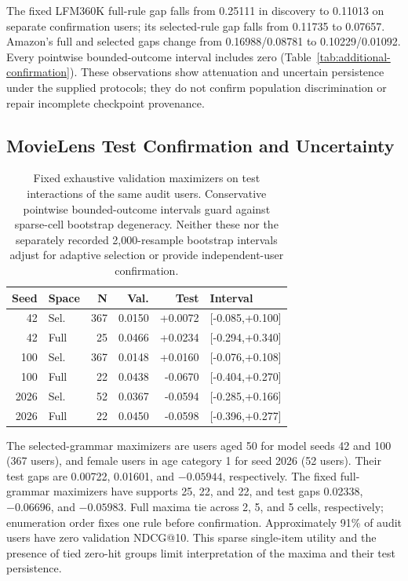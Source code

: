 \documentclass[sigconf,nonacm]{acmart}
\begin{document}
The fixed LFM360K full-rule gap falls from 0.25111 in discovery to 0.11013 on separate confirmation users; its selected-rule gap falls from 0.11735 to 0.07657. Amazon's full and selected gaps change from 0.16988/0.08781 to 0.10229/0.01092. Every pointwise bounded-outcome interval includes zero (Table~\ref{tab:additional-confirmation}). These observations show attenuation and uncertain persistence under the supplied protocols; they do not confirm population discrimination or repair incomplete checkpoint provenance.

\subsection{MovieLens Test Confirmation and Uncertainty}
\begin{table}[t]
\centering
\caption{Fixed exhaustive validation maximizers on test interactions of the same audit users. Conservative pointwise bounded-outcome intervals guard against sparse-cell bootstrap degeneracy. Neither these nor the separately recorded 2,000-resample bootstrap intervals adjust for adaptive selection or provide independent-user confirmation.}
\label{tab:extended-confirmation}
\small
\begin{tabular}{rlrrrl}
\toprule
Seed & Space & N & Val. & Test & Interval \\
\midrule
42 & Sel. & 367 & 0.0150 & +0.0072 & [-0.085,+0.100] \\
42 & Full & 25 & 0.0466 & +0.0234 & [-0.294,+0.340] \\
100 & Sel. & 367 & 0.0148 & +0.0160 & [-0.076,+0.108] \\
100 & Full & 22 & 0.0438 & -0.0670 & [-0.404,+0.270] \\
2026 & Sel. & 52 & 0.0367 & -0.0594 & [-0.285,+0.166] \\
2026 & Full & 22 & 0.0450 & -0.0598 & [-0.396,+0.277] \\
\bottomrule
\end{tabular}
\end{table}

The selected-grammar maximizers are users aged 50 for model seeds 42 and 100 (367 users), and female users in age category 1 for seed 2026 (52 users). Their test gaps are 0.00722, 0.01601, and $-0.05944$, respectively. The fixed full-grammar maximizers have supports 25, 22, and 22, and test gaps 0.02338, $-0.06696$, and $-0.05983$. Full maxima tie across 2, 5, and 5 cells, respectively; enumeration order fixes one rule before confirmation. Approximately 91\% of audit users have zero validation NDCG@10. This sparse single-item utility and the presence of tied zero-hit groups limit interpretation of the maxima and their test persistence.
\end{document}
